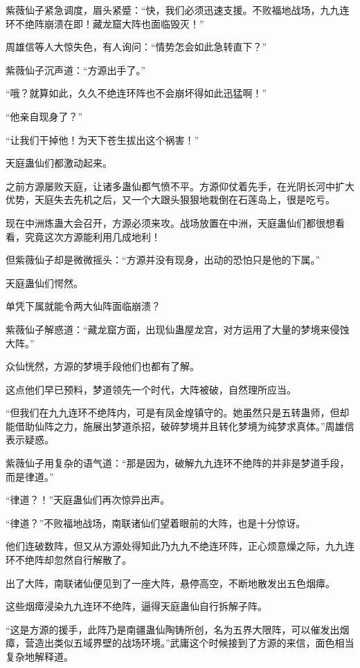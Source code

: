 \begin{this_body}
紫薇仙子紧急调度，眉头紧蹙：“快，我们必须迅速支援。不败福地战场，九九连环不绝阵崩溃在即！藏龙窟大阵也面临毁灭！”

周雄信等人大惊失色，有人询问：“情势怎会如此急转直下？”

紫薇仙子沉声道：“方源出手了。”

“哦？就算如此，久久不绝连环阵也不会崩坏得如此迅猛啊！”

“他亲自现身了？”

“让我们干掉他！为天下苍生拔出这个祸害！”

天庭蛊仙们都激动起来。

之前方源屡败天庭，让诸多蛊仙都气愤不平。方源仰仗着先手，在光阴长河中扩大优势，天庭失去先机之后，又一个大跟头狠狠地栽倒在石莲岛上，很是吃亏。

现在中洲炼蛊大会召开，方源必须来攻。战场放置在中洲，天庭蛊仙们都很想看看，究竟这次方源能利用几成地利！

但紫薇仙子却是微微摇头：“方源并没有现身，出动的恐怕只是他的下属。”

天庭蛊仙们愕然。

单凭下属就能令两大仙阵面临崩溃？

紫薇仙子解惑道：“藏龙窟方面，出现仙蛊屋龙宫，对方运用了大量的梦境来侵蚀大阵。”

众仙恍然，方源的梦境手段他们也都有了解。

这点他们早已预料，梦道领先一个时代，大阵被破，自然理所应当。

“但我们在九九连环不绝阵内，可是有凤金煌镇守的。她虽然只是五转蛊师，但却能借助仙阵之力，施展出梦道杀招，破碎梦境并且转化梦境为纯梦求真体。”周雄信表示疑惑。

紫薇仙子用复杂的语气道：“那是因为，破解九九连环不绝阵的并非是梦道手段，而是律道。”

“律道？！”天庭蛊仙们再次惊异出声。

“律道？”不败福地战场，南联诸仙们望着眼前的大阵，也是十分惊讶。

他们连破数阵，但又从方源处得知此乃九九不绝连环阵，正心烦意燥之际，九九连环不绝阵却忽然自行解散了。

出了大阵，南联诸仙便见到了一座大阵，悬停高空，不断地散发出五色烟瘴。

这些烟瘴浸染九九连环不绝阵，逼得天庭蛊仙自行拆解子阵。

“这是方源的援手，此阵乃是南疆蛊仙陶铸所创，名为五界大限阵，可以催发出烟瘴，营造出类似五域界壁的战场环境。”武庸这个时候接到了方源的来信，面色相当复杂地解释道。

\end{this_body}


